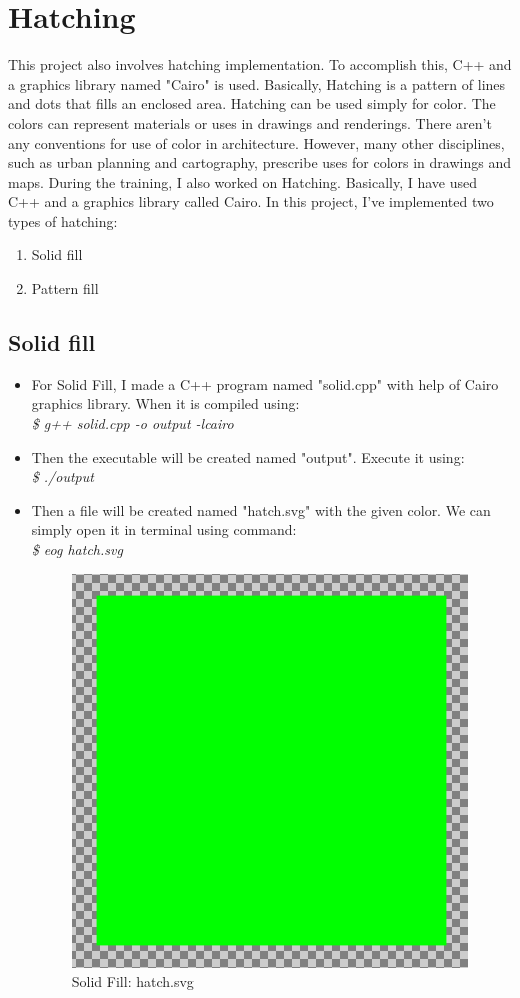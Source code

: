 \newpage
\section{Hatching}
This project also involves hatching implementation. To accomplish this, C++ and a graphics library named "Cairo" is used. Basically, Hatching is a pattern of lines and dots that fills an enclosed area. Hatching can be used simply for color. The colors can represent materials or uses in drawings and renderings. There aren't any conventions for use of color in architecture. However, many other disciplines, such as urban planning and cartography, prescribe uses for colors in drawings and maps.
\noindent During the training, I also worked on Hatching. Basically, I have used C++ and a graphics library called Cairo. 
In this project, I've implemented two types of hatching:
\begin{enumerate}
\item Solid fill
\item Pattern fill
\end{enumerate}
\subsection{Solid fill}
\begin{itemize}
\item For Solid Fill, I made a C++ program named "solid.cpp" with help of Cairo graphics library. When it is compiled using:\\
\textit{\$ g++ solid.cpp -o output -lcairo}
\item Then the executable will be created named "output". Execute it using:\\
\textit{\$ ./output}
\item Then a file will be created named "hatch.svg" with the given color.
We can simply open it in terminal using command:\\
\textit{\$ eog hatch.svg}
\begin{figure}[!ht]
\centering
\includegraphics[scale=0.7]{images/hatching/solid.png}                   
\vspace{-1em}
\caption{Solid Fill: hatch.svg}
\hspace{-1.5em}
\end{figure}
\end{itemize}
